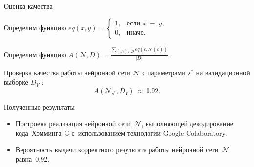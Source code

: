 \documentclass{beamer}
\begin{document}
\begin{frame}{Оценка качества}

\begin{block}{}
Определим функцию $eq(x, y) =
    \begin{cases}
            1, & \mbox{если } x~=~y, \\
        0, & \mbox{иначе}.
    \end{cases} $
\end{block}

\begin{block}{}
Определим функцию $A(\mathcal{N}, D) = \frac{\sum\limits_{(c, \widetilde{c})\in D}eq(c, \mathcal{N}(\widetilde{c}))}{|D|}$.
\end{block}

\begin{block}{}
Проверка качества работы нейронной сети $\mathcal{N}$ с параметрами $s^*$ на валидационной выборке $D_V$ :
$$ A(\mathcal{N}_{s^*}, D_V)~\approx~0.92. $$

\end{block}
\end{frame}








\begin{frame}{Полученные результаты}

 \begin{itemize}
  \item {
    Построена реализация нейронной сети~$\mathcal{N}$, выполняющей декодирование кода~Хэмминга~$\mathbb{C}$ с~использованием технологии Google Colaboratory.
  }
  \item {
    Вероятность выдачи корректного результата работы нейронной сети~$\mathcal{N}$ равна~0.92.
  }
  \end{itemize}

\end{frame}
\end{document}
